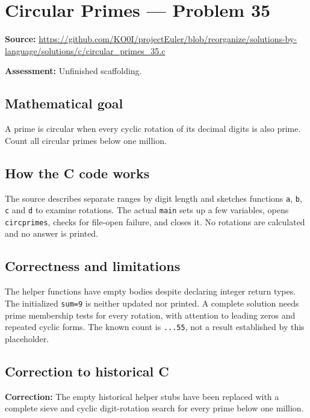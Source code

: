 \section{Circular Primes --- Problem 35}
\label{prob:35}
\noindent\textbf{Source:} \url{https://github.com/KO0I/projectEuler/blob/reorganize/solutions-by-language/solutions/c/circular_primes_35.c}

\noindent\textbf{Assessment:} Unfinished scaffolding.

\subsection*{Mathematical goal}
A prime is circular when every cyclic rotation of its decimal digits is also prime. Count all circular primes below one million.

\subsection*{How the C code works}
The source describes separate ranges by digit length and sketches functions \verb|a|, \verb|b|, \verb|c| and \verb|d| to examine rotations. The actual \verb|main| sets up a few variables, opens \verb|circprimes|, checks for file-open failure, and closes it. No rotations are calculated and no answer is printed.

\subsection*{Correctness and limitations}
The helper functions have empty bodies despite declaring integer return types. The initialized \verb|sum=9| is neither updated nor printed. A complete solution needs prime membership tests for every rotation, with attention to leading zeros and repeated cyclic forms. The known count is \texttt{...55}, not a result established by this placeholder.


\subsection*{Correction to historical C}
{\color{red}\textbf{Correction:} The empty historical helper stubs have been replaced with a complete sieve and cyclic digit-rotation search for every prime below one million.}

